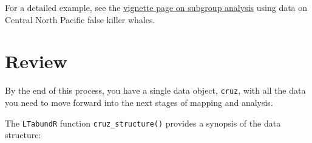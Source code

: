 \documentclass[
]{book}
\newenvironment{Shaded}{\begin{snugshade}}{\end{snugshade}}
\newcommand{\DecValTok}[1]{\textcolor[rgb]{0.00,0.00,0.81}{#1}}
\newcommand{\NormalTok}[1]{#1}
\newcommand{\SpecialCharTok}[1]{\textcolor[rgb]{0.00,0.00,0.00}{#1}}
\newcommand{\StringTok}[1]{\textcolor[rgb]{0.31,0.60,0.02}{#1}}
\begin{document}
\begin{Shaded}
\end{Shaded}

For a detailed example, see the \protect\hyperlink{subgroups}{vignette page on subgroup analysis} using data on Central North Pacific false killer whales.

\hypertarget{review}{%
\section*{Review}\label{review}}

By the end of this process, you have a single data object, \texttt{cruz}, with all the data you need to move forward into the next stages of mapping and analysis.

The \texttt{LTabundR} function \texttt{cruz\_structure()} provides a synopsis of the data structure:
\end{document}
